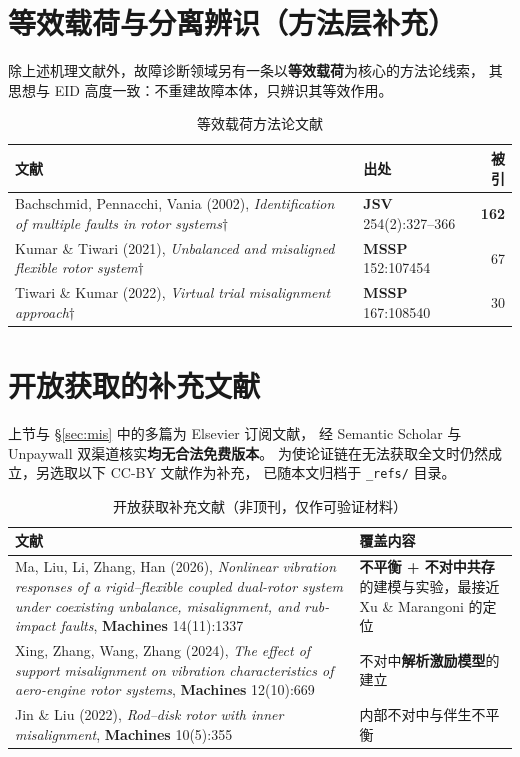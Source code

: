 \documentclass[11pt,a4paper]{ctexart}
\begin{document}
\section{等效载荷与分离辨识（方法层补充）}

除上述机理文献外，故障诊断领域另有一条以\textbf{等效载荷}为核心的方法论线索，
其思想与 EID 高度一致：不重建故障本体，只辨识其等效作用。

\begin{table}[h]
\centering
\caption{等效载荷方法论文献}
\small
\begin{tabular}{@{}p{8.2cm}p{3.4cm}r@{}}
\toprule
文献 & 出处 & 被引 \\
\midrule
Bachschmid, Pennacchi, Vania (2002), \emph{Identification of multiple faults in rotor systems}\(\dagger\)
& \textbf{JSV} 254(2):327--366 & \textbf{162} \\
Kumar \& Tiwari (2021), \emph{Unbalanced and misaligned flexible rotor system}\(\dagger\)
& \textbf{MSSP} 152:107454 & 67 \\
Tiwari \& Kumar (2022), \emph{Virtual trial misalignment approach}\(\dagger\)
& \textbf{MSSP} 167:108540 & 30 \\
\bottomrule
\end{tabular}
\end{table}

\section{开放获取的补充文献}

上节与 \S\ref{sec:mis} 中的多篇为 Elsevier 订阅文献，
经 Semantic Scholar 与 Unpaywall 双渠道核实\textbf{均无合法免费版本}。
为使论证链在无法获取全文时仍然成立，另选取以下 CC-BY 文献作为补充，
已随本文归档于 \texttt{\_refs/} 目录。

\begin{table}[h]
\centering
\caption{开放获取补充文献（非顶刊，仅作可验证材料）}
\small
\begin{tabular}{@{}p{6.4cm}p{4.6cm}@{}}
\toprule
文献 & 覆盖内容 \\
\midrule
Ma, Liu, Li, Zhang, Han (2026), \emph{Nonlinear vibration responses of a rigid--flexible coupled dual-rotor system under coexisting unbalance, misalignment, and rub-impact faults}, \textbf{Machines} 14(11):1337
& \textbf{不平衡 + 不对中共存}的建模与实验，最接近 Xu \& Marangoni 的定位 \\
Xing, Zhang, Wang, Zhang (2024), \emph{The effect of support misalignment on vibration characteristics of aero-engine rotor systems}, \textbf{Machines} 12(10):669
& 不对中\textbf{解析激励模型}的建立 \\
Jin \& Liu (2022), \emph{Rod--disk rotor with inner misalignment}, \textbf{Machines} 10(5):355
& 内部不对中与伴生不平衡 \\
\bottomrule
\end{tabular}
\end{table}
\end{document}
